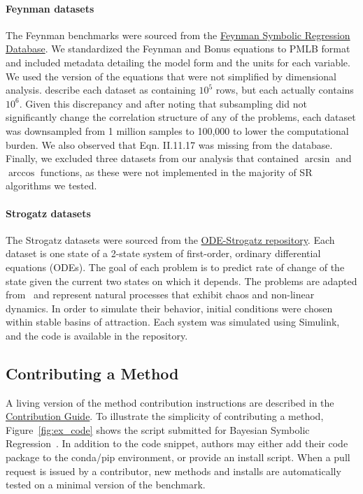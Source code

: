 \paragraph{Feynman datasets}
The Feynman benchmarks were sourced from the \href{https://space.mit.edu/home/tegmark/aifeynman.html}{Feynman Symbolic Regression Database}. 
We standardized the Feynman and Bonus equations to PMLB format and included metadata detailing the model form and the units for each variable. 
We used the version of the equations that were not simplified by dimensional analysis. 
\citet{udrescuAIFeynmanPhysicsInspired2020} describe each dataset as containing $10^5$ rows, but each actually contains $10^6$. 
Given this discrepancy and after noting that subsampling did not significantly change the correlation structure of any of the problems, each dataset was downsampled from 1 million samples to 100,000 to lower the computational burden.
We also observed that Eqn. II.11.17 was missing from the database. 
Finally, we excluded three datasets from our analysis that contained $\arcsin$ and $\arccos$ functions, as these were not implemented in the majority of SR algorithms we tested.

\paragraph{Strogatz datasets}
The Strogatz datasets were sourced from the \href{https://github.com/lacava/ode-strogatz}{ODE-Strogatz repository}.
Each dataset is one state of a 2-state system of first-order, ordinary differential equations (ODEs). 
The goal of each problem is to predict rate of change of the state given the current two states on which it depends. 
The problems are adapted from~\cite{strogatzNonlinearDynamicsChaos2014} and represent natural processes that exhibit chaos and non-linear dynamics.  
In order to simulate their behavior, initial conditions were chosen within stable basins of attraction.
Each system was simulated using Simulink, and the code is available in the repository.

\subsection{Contributing a Method}
A living version of the method contribution instructions are described in the \href{https://github.com/EpistasisLab/srbench/blob/master/CONTRIBUTING.md}{Contribution Guide}.
To illustrate the simplicity of contributing a method, Figure~\ref{fig:ex_code} shows the script submitted for Bayesian Symbolic Regression~\cite{jinBayesianSymbolicRegression2020}. 
In addition to the code snippet, authors may either add their code package to the conda/pip environment, or provide an install script.
When a pull request is issued by a contributor, new methods and installs are automatically tested on a minimal version of the benchmark.  

